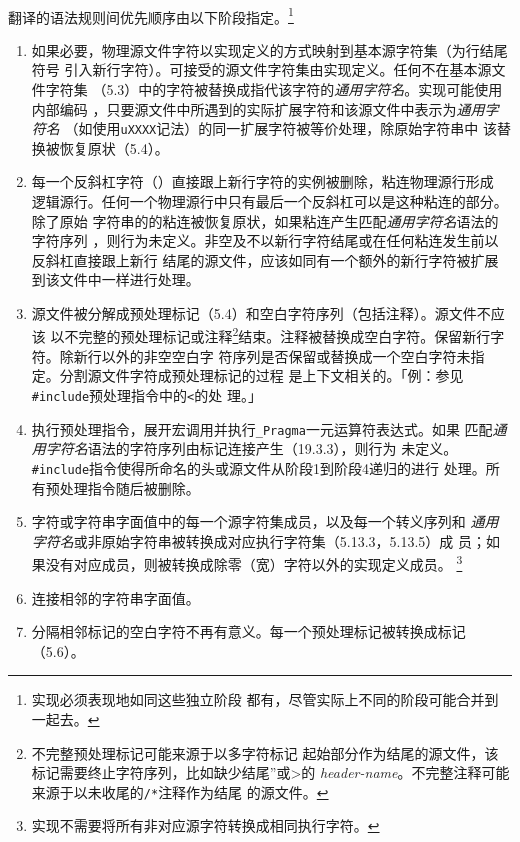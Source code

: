 \paragraph{}
翻译的语法规则间优先顺序由以下阶段指定。\footnote{实现必须表现地如同这些独立阶段
都有，尽管实际上不同的阶段可能合并到一起去。}
\begin{enumerate}[label={\arabic*}]
  \item{如果必要，物理源文件字符以实现定义的方式映射到基本源字符集（为行结尾符号
    引入新行字符）。可接受的源文件字符集由实现定义。任何不在基本源文件字符集
   （5.3）中的字符被替换成指代该字符的\textit{通用字符名}。实现可能使用内部编码
    ，只要源文件中所遇到的实际扩展字符和该源文件中表示为\textit{通用字符名}
    （如使用\texttt{\bs uXXXX}记法）的同一扩展字符被等价处理，除原始字符串中
    该替换被恢复原状（5.4）。}
  \item{每一个反斜杠字符（\bs）直接跟上新行字符的实例被删除，粘连物理源行形成
    逻辑源行。任何一个物理源行中只有最后一个反斜杠可以是这种粘连的部分。除了原始
    字符串的的粘连被恢复原状，如果粘连产生匹配\textit{通用字符名}语法的字符序列
    ，则行为未定义。非空及不以新行字符结尾或在任何粘连发生前以反斜杠直接跟上新行
    结尾的源文件，应该如同有一个额外的新行字符被扩展到该文件中一样进行处理。}
  \item{源文件被分解成预处理标记（5.4）和空白字符序列（包括注释）。源文件不应该
    以不完整的预处理标记或注释\footnote{不完整预处理标记可能来源于以多字符标记
    起始部分作为结尾的源文件，该标记需要终止字符序列，比如缺少结尾”或>的
    \textit{header-name}。不完整注释可能来源于以未收尾的\texttt{/*}注释作为结尾
    的源文件。}结束。注释被替换成空白字符。保留新行字符。除新行以外的非空空白字
    符序列是否保留或替换成一个空白字符未指定。分割源文件字符成预处理标记的过程
    是上下文相关的。「例：参见\texttt{\#include}预处理指令中的\texttt{<}的处
    理。」}
  \item{执行预处理指令，展开宏调用并执行\texttt{\_Pragma}一元运算符表达式。如果
    匹配\textit{通用字符名}语法的字符序列由标记连接产生（19.3.3），则行为
    未定义。\texttt{\#include}指令使得所命名的头或源文件从阶段1到阶段4递归的进行
    处理。所有预处理指令随后被删除。}
  \item{字符或字符串字面值中的每一个源字符集成员，以及每一个转义序列和
    \textit{通用字符名}或非原始字符串被转换成对应执行字符集（5.13.3，5.13.5）成
    员；如果没有对应成员，则被转换成除零（宽）字符以外的实现定义成员。
    \footnote{实现不需要将所有非对应源字符转换成相同执行字符。}}
  \item{连接相邻的字符串字面值。}
  \item{分隔相邻标记的空白字符不再有意义。每一个预处理标记被转换成标记（5.6）。
}
\end{enumerate}
